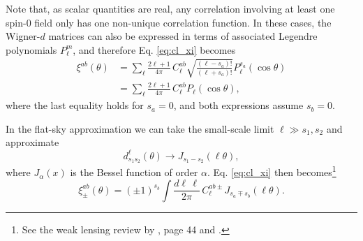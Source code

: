 \documentclass[\docopts]{\docclass}
\begin{document}
Note that, as scalar quantities are real, any correlation involving at least one spin-$0$ field only has one non-unique correlation function. In these cases, the Wigner-$d$ matrices can also be expressed in terms of associated Legendre polynomials $P^m_\ell$, and therefore Eq. \ref{eq:cl_xi} becomes
\begin{align}
  \xi^{ab}(\theta)&=\sum_\ell\frac{2\ell+1}{4\pi}\,C^{ab}_\ell\sqrt{\frac{(\ell-s_a)!}{(\ell+s_a)!}}P^{s_a}_\ell(\cos\theta)\\
                  &=\sum_\ell\frac{2\ell+1}{4\pi}\,C^{ab}_\ell P_\ell(\cos\theta),
\label{eq:xigg}
\end{align}
where the last equality holds for $s_a=0$, and both expressions assume $s_b=0$.

In the flat-sky approximation we can take the small-scale limit $\ell\gg s_1,s_2$ and approximate 
\begin{equation}
  d_{s_1s_2}^\ell(\theta)\longrightarrow J_{s_1-s_2}(\ell\theta),
\end{equation}
where $J_\alpha(x)$ is the Bessel function of order $\alpha$. Eq. \ref{eq:cl_xi} then becomes\footnote{See the weak lensing review by \citet{Bartelmann01}, page 44 and \citet{Joachimi10}.}
\begin{equation}
  \xi^{ab}_{\pm}(\theta)=\left(\pm1\right)^{s_b}\int\frac{d\ell\,\ell}{2\pi}\,C^{ab\pm}_\ell J_{s_a\mp s_b}(\ell\theta).
\end{equation}
\end{document}
